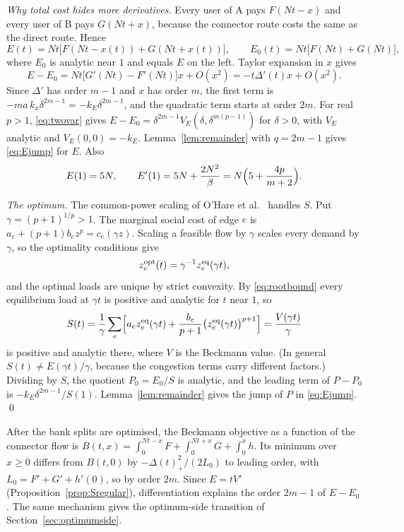 \emph{Why total cost hides more derivatives.} Every user of A pays $F(Nt-x)$ and every user of B pays $G(Nt+x)$, because the connector route costs the same as the direct route. Hence
\begin{equation}\label{eq:Ephysical}
 E(t)=Nt\bigl[F(Nt-x(t))+G(Nt+x(t))\bigr],\qquad E_0(t)=Nt\bigl[F(Nt)+G(Nt)\bigr],
\end{equation}
where $E_0$ is analytic near $1$ and equals $E$ on the left. Taylor expansion in $x$ gives
\begin{equation}\label{eq:Ecancel}
 E-E_0=Nt\bigl[G'(Nt)-F'(Nt)\bigr]x+O(x^2)=-t\Delta'(t)x+O(x^2).
\end{equation}
Since $\Delta'$ has order $m-1$ and $x$ has order $m$, the first term is $-ma\,k_x\delta^{2m-1}=-k_E\delta^{2m-1}$, and the quadratic term starts at order $2m$. For real $p>1$, \eqref{eq:twovar} gives $E-E_0=\delta^{2m-1}V_E(\delta,\delta^{m(p-1)})$ for $\delta>0$, with $V_E$ analytic and $V_E(0,0)=-k_E$. Lemma~\ref{lem:remainder} with $q=2m-1$ gives \eqref{eq:Ejump} for $E$. Also
\begin{equation}\label{eq:allfirst}
 E(1)=5N,\qquad E'(1)=5N+\frac{2N^2}{\beta}=N\Bigl(5+\frac{4p}{m+2}\Bigr).
\end{equation}

\emph{The optimum.} The common-power scaling of O'Hare et al.\ \cite[Theorem~3.5]{OCW2016} handles $S$. Put $\gamma=(p+1)^{1/p}>1$. The marginal social cost of edge $e$ is $a_e+(p+1)b_ez^p=c_e(\gamma z)$. Scaling a feasible flow by $\gamma$ scales every demand by $\gamma$, so the optimality conditions give
\begin{equation}\label{eq:optflow}
 z_e^{\mathrm{opt}}(t)=\gamma^{-1}z_e^{\mathrm{eq}}(\gamma t),
\end{equation}
and the optimal loads are unique by strict convexity. By \eqref{eq:rootbound} every equilibrium load at $\gamma t$ is positive and analytic for $t$ near $1$, so
\begin{equation}\label{eq:optcost}
 S(t)=\frac1\gamma\sum_e\Bigl[a_ez_e^{\mathrm{eq}}(\gamma t)+\frac{b_e}{p+1}\bigl(z_e^{\mathrm{eq}}(\gamma t)\bigr)^{p+1}\Bigr]=\frac{V(\gamma t)}{\gamma}
\end{equation}
is positive and analytic there, where $V$ is the Beckmann value. (In general $S(t)\ne E(\gamma t)/\gamma$, because the congestion terms carry different factors.) Dividing by $S$, the quotient $P_0=E_0/S$ is analytic, and the leading term of $P-P_0$ is $-k_E\delta^{2m-1}/S(1)$. Lemma~\ref{lem:remainder} gives the jump of $P$ in \eqref{eq:Ejump}. \qed

\begin{remark}\label{rem:potential}
After the bank splits are optimised, the Beckmann objective as a function of the connector flow is $B(t,x)=\int_0^{Nt-x}F+\int_0^{Nt+x}G+\int_0^xh$. Its minimum over $x\ge0$ differs from $B(t,0)$ by $-\Delta(t)_+^2/(2L_0)$ to leading order, with $L_0=F'+G'+h'(0)$, so by order $2m$. Since $E=tV'$ (Proposition~\ref{prop:Sregular}), differentiation explains the order $2m-1$ of $E-E_0$. The same mechanism gives the optimum-side transition of Section~\ref{sec:optimumside}.
\end{remark}
